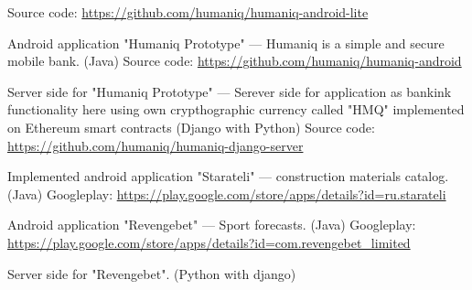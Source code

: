 \begin{cventries}
{\begin{cvitems}
{\begin{flushleft}
            Source code: \url{https://github.com/humaniq/humaniq-android-lite}\linebreak
        \end{flushleft}
    }
    \item {
        \begin{flushleft}
            Android application "Humaniq Prototype" --- Humaniq is a simple and secure mobile bank. (Java)\linebreak
            Source code: \url{https://github.com/humaniq/humaniq-android}\linebreak
        \end{flushleft}
    }
    \item {
        \begin{flushleft}
            Server side for "Humaniq Prototype" ---
            Serever side for application as bankink functionality here using own crypthographic currency called "HMQ" implemented on Ethereum smart contracts (Django with Python)\linebreak
            Source code: \url{https://github.com/humaniq/humaniq-django-server}\linebreak
        \end{flushleft}
    }
    \item {
        \begin{flushleft}
            Implemented android application "Starateli" --- construction materials catalog. (Java)\linebreak
            Googleplay: \url{https://play.google.com/store/apps/details?id=ru.starateli}\linebreak
        \end{flushleft}
    }
    \item {
        \begin{flushleft}
            Android application "Revengebet" --- Sport forecasts. (Java)\linebreak
            Googleplay: \url{https://play.google.com/store/apps/details?id=com.revengebet_limited}\linebreak
        \end{flushleft}
    }
    \item {
        \begin{flushleft}
            Server side for "Revengebet". (Python with django)\linebreak
        \end{flushleft}
    }
    \item {
        \begin{flushleft}

\end{flushleft}}
\end{cvitems}}
\end{cventries}
